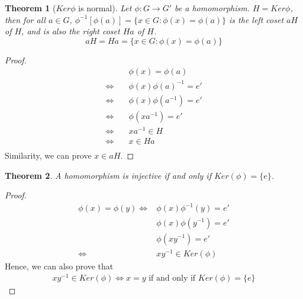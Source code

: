 \documentclass[11pt,a4paper]{article}
\newtheorem{theorem}{Theorem}
\begin{document}
\begin{theorem}[$Ker\phi$ is normal]
Let $\phi: G \rightarrow G'$ be a homomorphism. $H=Ker\phi$, then for all $a\in G$, $\phi^{-1}[\phi(a)]=\{x\in G:\phi(x)=\phi(a)\}$ is the left coset $aH$ of $H$, and is also the right coset $Ha$ of $H$.
$$aH=Ha=\{x\in G:\phi(x)=\phi(a)\}$$
\end{theorem}
\begin{proof}
\begin{equation}
    \begin{aligned}
        &\phi(x)=\phi(a)\\
        \Leftrightarrow\quad	&\phi(x)\phi(a)^{-1}=e'\\
        \Leftrightarrow\quad	&\phi(x)\phi(a^{-1})=e'\\
        \Leftrightarrow\quad	&\phi(xa^{-1})=e'\\
        \Leftrightarrow\quad	&xa^{-1}\in H\\
        \Leftrightarrow\quad	&x\in Ha\\
    \end{aligned}
    \nonumber
\end{equation}
Similarity, we can prove $x\in aH$.
\end{proof}

\begin{theorem}
    A homomorphism is injective if and only if $Ker(\phi)=\{e\}$.
\end{theorem}
\begin{proof}
        \begin{equation}
            \begin{aligned}
                \phi(x)=\phi(y) \Leftrightarrow	&\phi(x)\phi^{-1}(y)=e'\\
                &\phi(x)\phi(y^{-1})=e'\\
                &\phi(xy^{-1})=e'\\
                \Leftrightarrow	&xy^{-1}\in Ker(\phi)
            \end{aligned}
            \nonumber
        \end{equation}
        Hence, we can also prove that
        \begin{equation}
            \begin{aligned}
                xy^{-1}\in Ker(\phi)\Leftrightarrow x=y\text{ if and only if }Ker(\phi)=\{e\}
            \end{aligned}
            \nonumber
        \end{equation}
\end{proof}
\end{document}
